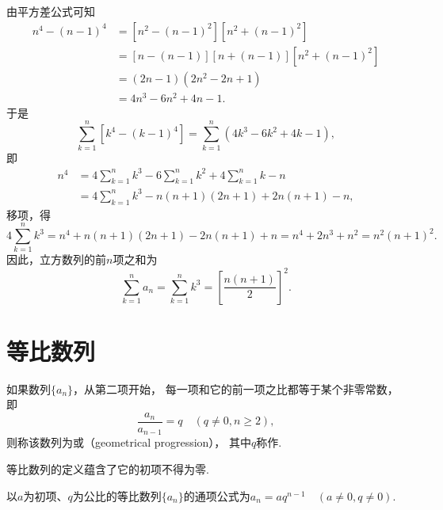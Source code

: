 由平方差公式可知
\begin{equation*}\begin{aligned}
n^4 - (n-1)^4
&= [n^2 - (n-1)^2] [n^2 + (n-1)^2] \\
&= [n - (n-1)] [n + (n-1)] [n^2 + (n-1)^2] \\
&= (2n-1) (2n^2 - 2n + 1) \\
&= 4n^3 - 6n^2 + 4n - 1.
\end{aligned}\end{equation*}
于是\begin{equation*}
\sum_{k=1}^n [k^4 - (k-1)^4]
= \sum_{k=1}^n (4k^3 - 6k^2 + 4k - 1),
\end{equation*}即\begin{equation*}\begin{aligned}
n^4
&= 4 \sum_{k=1}^n k^3 - 6 \sum_{k=1}^n k^2 + 4 \sum_{k=1}^n k - n \\
&= 4 \sum_{k=1}^n k^3 - n(n+1)(2n+1) + 2n(n+1) - n,
\end{aligned}\end{equation*}
移项，得\begin{equation*}
4 \sum_{k=1}^n k^3
= n^4 + n(n+1)(2n+1) - 2n(n+1) + n
= n^4 + 2n^3 + n^2
= n^2(n+1)^2.
\end{equation*}
因此，立方数列的前\(n\)项之和为
\begin{equation}
\sum_{k=1}^n a_n
= \sum_{k=1}^n k^3
= \left[\frac{n(n+1)}{2}\right]^2.
\end{equation}

\section{等比数列}
\begin{definition}
如果数列\(\{a_n\}\)，从第二项开始，
每一项和它的前一项之比都等于某个非零常数，
即\begin{equation*}
	\frac{a_n}{a_{n-1}} = q
	\quad(q \neq 0,n \geq 2),
\end{equation*}
则称该数列为或（geometrical progression），
其中\(q\)称作.
\end{definition}
\begin{remark}
等比数列的定义蕴含了它的初项不得为零.
\end{remark}

\begin{property}
以\(a\)为初项、\(q\)为公比的等比数列\(\{a_n\}\)的通项公式为\(
	a_n = a q^{n-1}
	\quad(a\neq0,q\neq0)
\).
\end{property}

